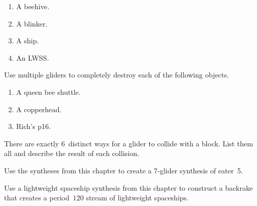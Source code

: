 \begin{multicols}{2}
\begin{problem}
\begin{enumerate}[label=\bf\color{ocre}(\alph*)]
		\item A beehive.
		
		\item A blinker.
		
		\item A ship.
		
		\item An LWSS.
	\end{enumerate}
\end{problem}


\mfilbreak


\begin{problem}\label{exer:multiple_glider_cleanup}
	Use multiple gliders to completely destroy each of the following objects.
	
	\begin{enumerate}[label=\bf\color{ocre}(\alph*)]
		\item A queen bee shuttle.
		
		\item A copperhead.
		
		\item Rich's p16.
	\end{enumerate}
\end{problem}


\mfilbreak


\begin{problemstar}\label{exer:glider_block_collisions}
	There are exactly $6$~distinct ways for a glider to collide with a block. List them all and describe the result of each collision.
\end{problemstar}


\mfilbreak


\begin{problemstar}\label{exer:twit_synthesis}
	Use the syntheses from this chapter to create a 7-glider synthesis of eater~5.
\end{problemstar}


\mfilbreak


\begin{problem}\label{exer:p60_lwss_backrake}
	Use a lightweight spaceship synthesis from this chapter to construct a backrake that creates a period~$120$ stream of lightweight spaceships.
\end{problem}



\end{multicols}
